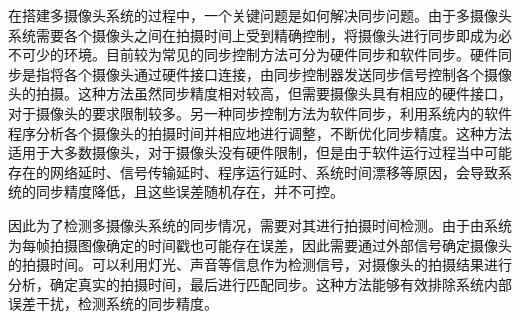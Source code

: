 在搭建多摄像头系统的过程中，一个关键问题是如何解决同步问题。由于多摄像头系统需要各个摄像头之间在拍摄时间上受到精确控制，将摄像头进行同步即成为必不可少的环境。目前较为常见的同步控制方法可分为硬件同步和软件同步。硬件同步是指将各个摄像头通过硬件接口连接，由同步控制器发送同步信号控制各个摄像头的拍摄。这种方法虽然同步精度相对较高，但需要摄像头具有相应的硬件接口，对于摄像头的要求限制较多。另一种同步控制方法为软件同步，利用系统内的软件程序分析各个摄像头的拍摄时间并相应地进行调整，不断优化同步精度。这种方法适用于大多数摄像头，对于摄像头没有硬件限制，但是由于软件运行过程当中可能存在的网络延时、信号传输延时、程序运行延时、系统时间漂移等原因，会导致系统的同步精度降低，且这些误差随机存在，并不可控。

因此为了检测多摄像头系统的同步情况，需要对其进行拍摄时间检测。由于由系统为每帧拍摄图像确定的时间戳也可能存在误差，因此需要通过外部信号确定摄像头的拍摄时间。可以利用灯光、声音等信息作为检测信号，对摄像头的拍摄结果进行分析，确定真实的拍摄时间，最后进行匹配同步。这种方法能够有效排除系统内部误差干扰，检测系统的同步精度。